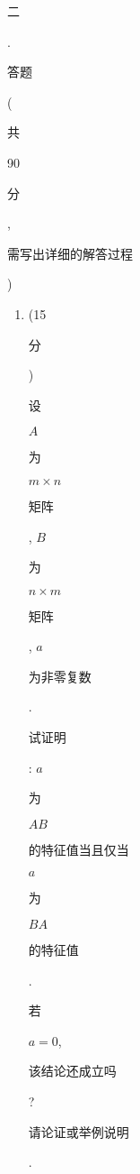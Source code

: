 \documentclass[10pt]{article}
\begin{document}
\begin{CJK}{UTF8}{mj}二\end{CJK}. \begin{CJK}{UTF8}{mj}答题\end{CJK}(\begin{CJK}{UTF8}{mj}共\end{CJK} 90 \begin{CJK}{UTF8}{mj}分\end{CJK}, \begin{CJK}{UTF8}{mj}需写出详细的解答过程\end{CJK})

\begin{enumerate}
  \item (15 \begin{CJK}{UTF8}{mj}分\end{CJK}) \begin{CJK}{UTF8}{mj}设\end{CJK} $A$ \begin{CJK}{UTF8}{mj}为\end{CJK} $m \times n$ \begin{CJK}{UTF8}{mj}矩阵\end{CJK}, $B$ \begin{CJK}{UTF8}{mj}为\end{CJK} $n \times m$ \begin{CJK}{UTF8}{mj}矩阵\end{CJK}, $a$ \begin{CJK}{UTF8}{mj}为非零复数\end{CJK}. \begin{CJK}{UTF8}{mj}试证明\end{CJK}: $a$ \begin{CJK}{UTF8}{mj}为\end{CJK} $A B$ \begin{CJK}{UTF8}{mj}的特征值当且仅当\end{CJK} $a$ \begin{CJK}{UTF8}{mj}为\end{CJK} $B A$ \begin{CJK}{UTF8}{mj}的特征值\end{CJK}. \begin{CJK}{UTF8}{mj}若\end{CJK} $a=0$, \begin{CJK}{UTF8}{mj}该结论还成立吗\end{CJK}? \begin{CJK}{UTF8}{mj}请论证或举例说明\end{CJK}.


\end{enumerate}
\end{document}
